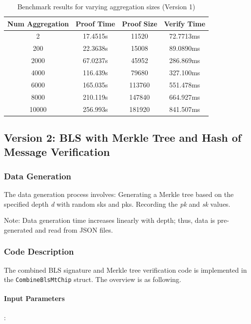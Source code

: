 \documentclass{article}
\begin{document}
\begin{table}[h]
    \centering
    \begin{tabular}{c|c|c|c} \hline
        Num Aggregation & Proof Time & Proof Size & Verify Time \\ \hline
        2 & 17.4515s & 11520 & 72.7713ms \\ \hline
        200 & 22.3638s & 15008 & 89.0890ms \\ \hline
        2000 & 67.0237s & 45952 & 286.869ms \\ \hline
        4000 & 116.439s & 79680 & 327.100ms \\ \hline
        6000 & 165.035s & 113760 & 551.478ms \\ \hline
        8000 & 210.119s & 147840 & 664.927ms \\ \hline
        10000 & 256.993s & 181920 & 841.507ms \\ \hline
    \end{tabular}
    \caption{Benchmark results for varying aggregation sizes (Version 1)}
    \label{tab:version1_agg}
\end{table}


\subsection{Version 2: BLS with Merkle Tree and Hash of Message Verification}
\subsubsection{Data Generation}
The data generation process involves:
Generating a Merkle tree based on the specified depth \textit{d} with random sks and pks.
Recording the \textit{pk} and \textit{sk} values.


Note: Data generation time increases linearly with depth; thus, data is pre-generated and read from JSON files.

\subsubsection{Code Description}

The combined BLS signature and Merkle tree verification code is implemented in the \texttt{CombineBlsMtChip} struct.  The overview is as following.

\paragraph{Input Parameters}
:
\end{document}
